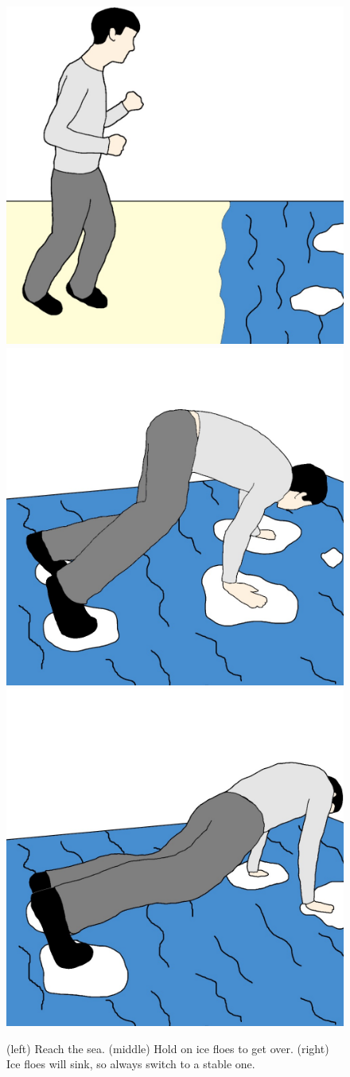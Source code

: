 \documentclass{sigchi}
\begin{document}
  \begin{figure}[!htb]
    \centering
    \includegraphics[width=0.32\linewidth]{Image_7.jpg}
    \includegraphics[width=0.32\linewidth]{Image_2.jpg}
    \includegraphics[width=0.32\linewidth]{Image_8.jpg}
    \caption{(left) Reach the sea. (middle) Hold on ice floes to get over. (right) Ice floes will sink, so always switch to a stable one.}
  \end{figure}
\end{document}
